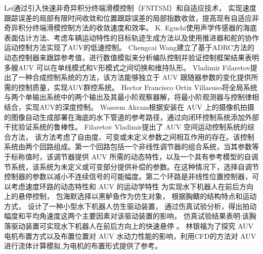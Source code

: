 Lei通过引入快速非奇异积分终端滑模控制（FNITSM）和自适应技术，
实现速度跟踪误差的局部有限时间收敛和位置跟踪误差的局部指数收敛，提高现有自适应非奇异积分终端滑模控制方法的收敛速度和效率\cite{ref10}。
K. Eguchi使用声学传感器的海底表面估计方法、考虑车辆运动特性的目标轨迹生成方法以及使用推进器和舵的协作运动控制方法实现了AUV的低速控制\cite{ref11}。
Chengcai Wang建立了基于ADRC方法的动态控制器来跟踪参考值，进行数值模拟来分析编队控制并验证控制框架结果表明多艘AUV
可以在单线模式和V形模式之间切换和维持队形\cite{ref12}。
Vladimir Filaretov提出了一种合成控制系统的方法，该方法能够独立于 AUV 跟随器参数的变化提供所需的控制质量，实现AUV群控系统\cite{ref13}。
Hector Francisco Ortiz Villasuso将全局系统与两个单输出系统中的两个输出及其最小阶观察器解，将最小阶观测器与控制律相结合，实现AUV的深度控制\cite{ref14}。
Waseem Akram根据安装在 AUV 上的摄像机拍摄的图像自动生成部署在海底的水下管道的参考路径，通过向闭环控制系统添加外部干扰验证系统的鲁棒性\cite{ref15}。
Filaretov Vladimir提出了 AUV 空间运动控制系统的综合方法\cite{ref16}，
该方法考虑了自由度、可变或未定义参数之间相互作用的存在。该控制系统由两个回路组成。第一个回路包括一个非线性调节器的组合系统，当其参数等于标称值时，该调节器提供 AUV 所需的动态特性，以及一个具有参考模型的自调节系统，该系统为未定义或可变部分提供补偿的参数。在这种情况下，选择自调节控制器的参数以减小不连续信号的可能幅度。第二个环路是非线性位置控制器，可以考虑速度环路的动态特性和 AUV 的运动学特性
为实现水下机器人在前后方向上的悬停控制，
包海默\cite{ref17}选择以黑鲈鱼作为仿生对象，
根据胸鳍的结构特点和运动方式，
设计了一种小型水下机器人仿生驱动装置，
通过伤真试验分析，得出拍动幅度和平均角速度这两个主要因素对该驱动装置的影响，
仿真试验结果表明:该胸落驱动装置可实现水下机器人在前后方向上的快速悬停 。
林银福\cite{ref18}为了探究 AUV 电机布置方式以及布置位置对 AUV 水动力性能的影响，利用CFD的方法对 AUV 进行流体计算模拟,为电机的布置形式提供了参考。
